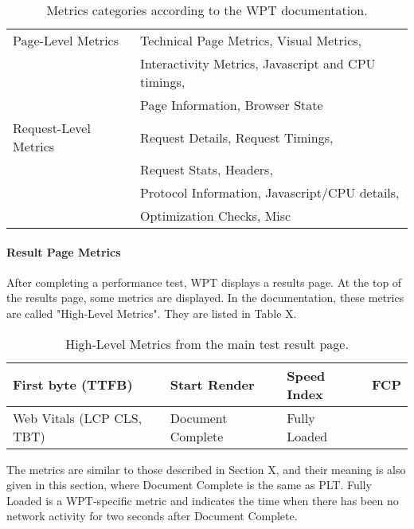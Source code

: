 \begin{table}[h]
	\small
	\centering
	\begin{tabular}{l | l}
	\hline
	Page-Level Metrics & Technical Page Metrics, Visual Metrics, \\
	& Interactivity Metrics, Javascript and CPU timings, \\
	& Page Information, Browser State \\
	\hline
	Request-Level Metrics & Request Details, Request Timings, \\
	& Request Stats, Headers, \\
	& Protocol Information, Javascript/CPU details, \\
	& Optimization Checks, Misc \\
	\hline
	\end{tabular}
	\medskip
	\caption{Metrics categories according to the WPT documentation.}
	\label{table:wpt_metrics_categories}
\end{table}


\paragraph{Result Page Metrics} %

After completing a performance test, WPT displays a results page.
At the top of the results page, some metrics are displayed.
In the documentation, these metrics are called "High-Level Metrics". %
They are listed in Table X.


\begin{table}[h]
	\small
	\centering
	\begin{tabular}{| l | l | l | l |}
	\hline
	First byte (TTFB) & Start Render & Speed Index & FCP \\
	\hline
	Web Vitals (LCP CLS, TBT) & Document Complete & Fully Loaded & \\
	\hline
	\end{tabular}
	\medskip
	\caption{High-Level Metrics from the main test result page.}
	\label{table:wpt_metrics_categories}
\end{table}

The metrics are similar to those described in Section X, and their meaning is also given in this section, where Document Complete is the same as PLT.
Fully Loaded is a WPT-specific metric and indicates the time when there has been no network activity for two seconds after Document Complete. %

